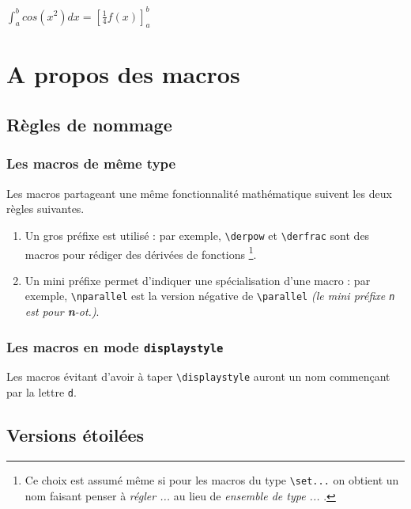 \documentclass[12pt,a4paper]{article}
\begin{document}
\begin{latexex}
$\displaystyle \int_a^b cos(x^2) dx
 = \left[ \frac{1}{4} f(x) \right]_a^b$
\end{latexex}




\section{A propos des macros}

\subsection{Règles de nommage}

\subsubsection{Les macros de même \og type \fg}

Les macros partageant une même fonctionnalité mathématique suivent les deux règles suivantes.
\begin{enumerate}
	\item Un gros préfixe est utilisé : 
	      par exemple, \verb+\derpow+ et \verb+\derfrac+ sont des macros pour rédiger des dérivées de fonctions
	      \footnote{
	      	Ce choix est assumé même si pour les macros du type \texttt{\textbackslash{}set...} on obtient un nom faisant penser à \emph{\og régler ... \fg} au lieu de \emph{\og ensemble de type ... \fg}.
		  }.

	\item Un mini préfixe permet d'indiquer une spécialisation d'une macro : 
	      par exemple, \verb+\nparallel+ est la version négative de \verb+\parallel+ \emph{(le mini préfixe \texttt{n} est pour \textbf{n}-ot.)}.
\end{enumerate}




\subsubsection{Les macros en mode \texttt{displaystyle}}

Les macros évitant d'avoir à taper \verb+\displaystyle+ auront un nom commençant par la lettre \verb+d+.




\subsection{Versions étoilées}
\end{document}

